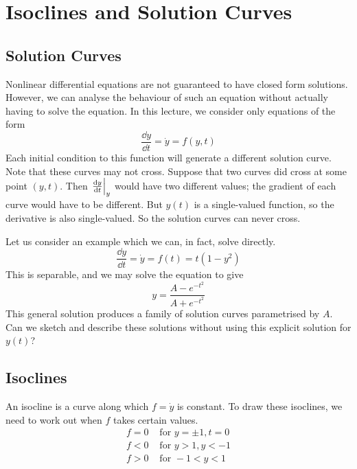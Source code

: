 \documentclass{article}
\begin{document}
\section{Isoclines and Solution Curves}
\subsection{Solution Curves}
Nonlinear differential equations are not guaranteed to have closed form solutions. However, we can analyse the behaviour of such an equation without actually having to solve the equation. In this lecture, we consider only equations of the form
\[ \frac{\dd y}{\dd t} = \dot y = f(y, t) \]
Each initial condition to this function will generate a different solution curve. Note that these curves may not cross. Suppose that two curves did cross at some point $(y, t)$. Then $\eval{\frac{\dd y}{\dd t}}_y$ would have two different values; the gradient of each curve would have to be different. But $y(t)$ is a single-valued function, so the derivative is also single-valued. So the solution curves can never cross.

Let us consider an example which we can, in fact, solve directly.
\[ \frac{\dd y}{\dd t} = \dot y = f(t) = t(1 - y^2) \]
This is separable, and we may solve the equation to give
\[ y = \frac{A - e^{-t^2}}{A + e^{-t^2}} \]
This general solution produces a family of solution curves parametrised by $A$. Can we sketch and describe these solutions without using this explicit solution for $y(t)$?

\subsection{Isoclines}
An isocline is a curve along which $f = \dot y$ is constant. To draw these isoclines, we need to work out when $f$ takes certain values.
\begin{align*}
	f = 0 & \text{ for } y = \pm 1, t = 0 \\
	f < 0 & \text{ for } y > 1, y < -1    \\
	f > 0 & \text{ for } -1 < y < 1
\end{align*}
\end{document}
